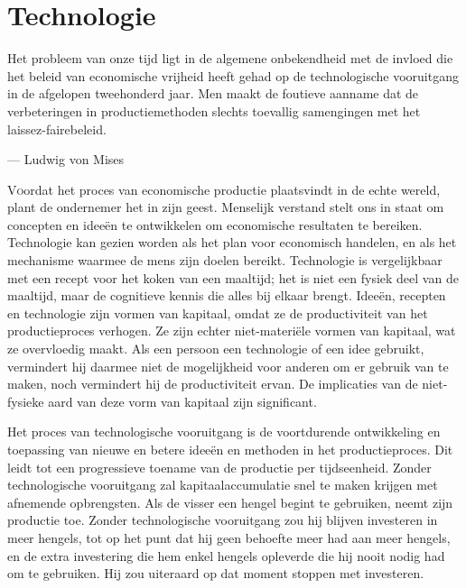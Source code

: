 \hypertarget{technologie}{%
\chapter{Technologie}\label{technologie}}

\vspace{-1em}
\begin{blockquotebox}
    Het probleem van onze tijd ligt in de algemene onbekendheid met de invloed die het beleid van economische vrijheid heeft gehad op de technologische vooruitgang in de afgelopen tweehonderd jaar. Men maakt de foutieve aanname dat de verbeteringen in productiemethoden slechts toevallig samengingen met het laissez-fairebeleid.\footnotemark
    \par\raggedleft--- Ludwig von Mises
\end{blockquotebox}
\autocite{71}

\vspace{-0.5em}
\lettrine{V}oordat het proces van economische productie plaatsvindt in de echte wereld, plant de ondernemer het in zijn geest. Menselijk verstand stelt ons in staat om concepten en ideeën te ontwikkelen om economische resultaten te bereiken. Technologie kan gezien worden als het plan voor economisch handelen, en als het mechanisme waarmee de mens zijn doelen bereikt. Technologie is vergelijkbaar met een recept voor het koken van een maaltijd; het is niet een fysiek deel van de maaltijd, maar de cognitieve kennis die alles bij elkaar brengt. Ideeën, recepten en technologie zijn vormen van kapitaal, omdat ze de productiviteit van het productieproces verhogen. Ze zijn echter niet-materiële vormen van kapitaal, wat ze overvloedig maakt. Als een persoon een technologie of een idee gebruikt, vermindert hij daarmee niet de mogelijkheid voor anderen om er gebruik van te maken, noch vermindert hij de productiviteit ervan. De implicaties van de niet-fysieke aard van deze vorm van kapitaal zijn significant.

Het proces van technologische vooruitgang is de voortdurende ontwikkeling en toepassing van nieuwe en betere ideeën en methoden in het productieproces. Dit leidt tot een progressieve toename van de productie per tijdseenheid. Zonder technologische vooruitgang zal kapitaalaccumulatie snel te maken krijgen met afnemende opbrengsten. Als de visser een hengel begint te gebruiken, neemt zijn productie toe. Zonder technologische vooruitgang zou hij blijven investeren in meer hengels, tot op het punt dat hij geen behoefte meer had aan meer hengels, en de extra investering die hem enkel hengels opleverde die hij nooit nodig had om te gebruiken. Hij zou uiteraard op dat moment stoppen met investeren.

